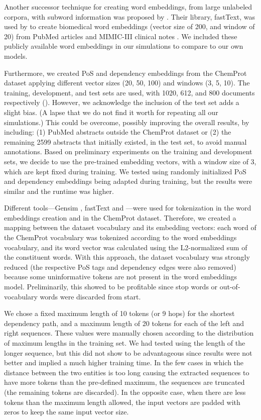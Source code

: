 Another successor technique for creating word embeddings, from large unlabeled corpora, with subword information was proposed by \textcite{bojanowski2017a}.
Their library, fastText, was used by \textcite{chen2019g} to create biomedical word embeddings (vector size of 200, and window of 20) from PubMed articles and MIMIC-III clinical notes \parencite{johnson2016a}.
We included these publicly available word embeddings in our simulations to compare to our own models.

Furthermore, we created PoS and dependency embeddings from the ChemProt dataset applying different vector sizes (20, 50, 100) and windows (3, 5, 10).
The training, development, and test sets are used, with 1020, 612, and 800 documents respectively ().
However, we acknowledge the inclusion of the test set adds a slight bias.
(A lapse that we do not find it worth for repeating all our simulations.)
This could be overcome, possibly improving the overall results, by including: (1) PubMed abstracts outside the ChemProt dataset or (2) the remaining 2599 abstracts that initially existed, in the test set, to avoid manual annotations.
Based on preliminary experiments on the training and development sets, we decide to use the pre-trained embedding vectors, with a window size of 3, which are kept fixed during training.
We tested using randomly initialized PoS and dependency embeddings being adapted during training, but the results were similar and the runtime was higher.

Different tools---Gensim \parencite{rehurek2010a}, fastText \parencite{bojanowski2017a} and  \parencite{bjorne2015a}---were used for tokenization in the word embeddings creation and in the ChemProt dataset.
Therefore, we created a mapping between the dataset vocabulary and its embedding vectors: each word of the ChemProt vocabulary was tokenized according to the word embeddings vocabulary, and its word vector was calculated using the L2-normalized sum of the constituent words.
With this approach, the dataset vocabulary was strongly reduced (the respective PoS tags and dependency edges were also removed) because some uninformative tokens are not present in the word embeddings model.
Preliminarily, this showed to be profitable since stop words or out-of-vocabulary words were discarded from start.

We chose a fixed maximum length of 10 tokens (or 9 hops) for the shortest dependency path, and a maximum length of 20 tokens for each of the left and right sequences.
These values were manually chosen according to the distribution of maximum lengths in the training set.
We had tested using the length of the longer sequence, but this did not show to be advantageous since results were not better and implied a much higher training time.
In the few cases in which the distance between the two entities is too long causing the extracted sequences to have more tokens than the pre-defined maximum, the sequences are truncated (the remaining tokens are discarded).
In the opposite case, when there are less tokens than the maximum length allowed, the input vectors are padded with zeros to keep the same input vector size.


